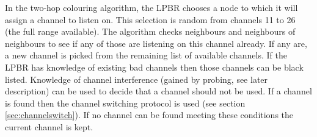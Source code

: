 In the two-hop colouring algorithm, the LPBR chooses a node to which it will assign a channel to listen on.  
This selection is random from channels 11 to 26 (the full range available). The algorithm checks neighbours and neighbours of neighbours to see if any of those are listening on this channel already. If any are, a new channel is picked from the remaining list of available channels. If the LPBR has knowledge of existing bad channels then those channels can be black listed.  Knowledge of channel interference (gained by probing, see later description) can be used to decide that a channel should not be used. If a channel is found then the channel switching protocol is used (see section \ref{sec:channelswitch}). If no channel can be found meeting these conditions the current
channel is kept.  

